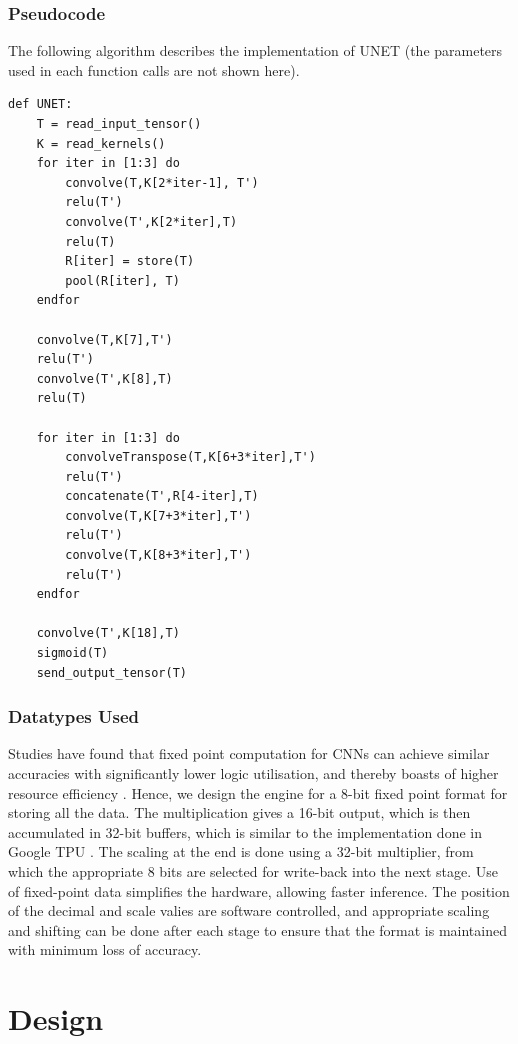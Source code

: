 \documentclass[a4paper,12pt, final]{report}
\begin{document}
\subsection{Pseudocode}\label{pseudocode}

The following algorithm describes the implementation of UNET (the parameters used in each function calls are not shown here).

\begin{Verbatim}
def UNET:
    T = read_input_tensor()
    K = read_kernels()
    for iter in [1:3] do
        convolve(T,K[2*iter-1], T')
        relu(T')
        convolve(T',K[2*iter],T)
        relu(T)
        R[iter] = store(T)
        pool(R[iter], T)
    endfor
    
    convolve(T,K[7],T')
    relu(T')
    convolve(T',K[8],T)
    relu(T)
    
    for iter in [1:3] do
        convolveTranspose(T,K[6+3*iter],T')
        relu(T')
        concatenate(T',R[4-iter],T)
        convolve(T,K[7+3*iter],T')
        relu(T')
        convolve(T,K[8+3*iter],T')
        relu(T')
    endfor

    convolve(T',K[18],T)
    sigmoid(T)
    send_output_tensor(T)
\end{Verbatim}

\subsection{Datatypes Used}

Studies have found that fixed point computation for CNNs can achieve similar accuracies with significantly lower logic utilisation, and thereby boasts of higher resource efficiency \cite{FPGA2,FPGA3}. Hence, we design the engine for a 8-bit fixed point format for storing all the data. The multiplication gives a 16-bit output, which is then accumulated in 32-bit buffers, which is similar to the implementation done in Google TPU \cite{TPU}. The scaling at the end is done using a 32-bit multiplier, from which the appropriate 8 bits are selected for write-back into the next stage.  Use of fixed-point data simplifies the hardware, allowing faster inference. The position of the decimal and scale valies are software controlled, and appropriate scaling and shifting can be done after each stage to ensure that the format is maintained with minimum loss of accuracy.


\chapter{Design}\label{ch:3}
\end{document}
